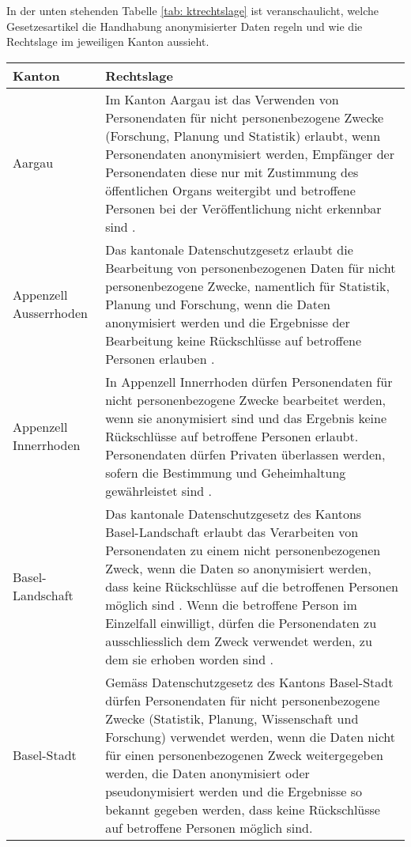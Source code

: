 In der unten stehenden Tabelle \ref{tab: ktrechtslage} ist veranschaulicht, welche Gesetzesartikel die Handhabung anonymisierter Daten regeln und wie die Rechtslage im jeweiligen Kanton aussieht.

\newpage
\begin{longtable}{| p{} | p{}|} 
		\hline
		\textbf{Kanton} & \textbf{Rechtslage}  \\ 
    \hline
    Aargau & Im Kanton Aargau ist das Verwenden von Personendaten für nicht personenbezogene Zwecke (Forschung, Planung und Statistik) erlaubt, wenn Personendaten anonymisiert werden, Empfänger der Personendaten diese nur mit Zustimmung des öffentlichen Organs weitergibt und betroffene Personen bei der Veröffentlichung nicht erkennbar sind \parencite[§§ 19 Abs. 1]{DSSGAARGAU}. \\
    \hline
		Appenzell Ausserrhoden & Das kantonale Datenschutzgesetz erlaubt die Bearbeitung von personenbezogenen Daten für nicht personenbezogene Zwecke, namentlich für Statistik, Planung und Forschung, wenn die Daten anonymisiert werden und die Ergebnisse der Bearbeitung keine Rückschlüsse auf betroffene Personen erlauben \parencite[§§ 14 Abs. 1]{DSSGAARh}. \\
    \hline
		Appenzell Innerrhoden & In Appenzell Innerrhoden dürfen Personendaten für nicht personenbezogene Zwecke bearbeitet werden, wenn sie anonymisiert sind und das Ergebnis keine Rückschlüsse auf betroffene Personen erlaubt. Personendaten dürfen Privaten überlassen werden, sofern die Bestimmung und Geheimhaltung gewährleistet sind \parencite[§§ 7 Abs 1-2]{DSSGAIRh}.\\
    \hline
		Basel-Landschaft & Das kantonale Datenschutzgesetz des Kantons Basel-Landschaft erlaubt das Verarbeiten von Personendaten zu einem nicht personenbezogenen Zweck, wenn die Daten so anonymisiert werden, dass keine Rückschlüsse auf die betroffenen Personen möglich sind \parencite[§§ 11 Abs. 2]{DSSGBL}. Wenn die betroffene Person im Einzelfall einwilligt, dürfen die Personendaten zu ausschliesslich dem Zweck verwendet werden, zu dem sie erhoben worden sind \parencite[§§ 11 Abs. 1]{DSSGBL}. \\
		\hline
		Basel-Stadt &  Gemäss Datenschutzgesetz des Kantons Basel-Stadt \parencite[§§ 10 Abs. 1]{DSSGBS} dürfen Personendaten für nicht personenbezogene Zwecke (Statistik, Planung, Wissenschaft und Forschung) verwendet werden, wenn die Daten nicht für einen personenbezogenen Zweck weitergegeben werden, die Daten anonymisiert oder pseudonymisiert werden und die Ergebnisse so bekannt gegeben werden, dass keine Rückschlüsse auf betroffene Personen möglich sind. \\

\end{longtable}
